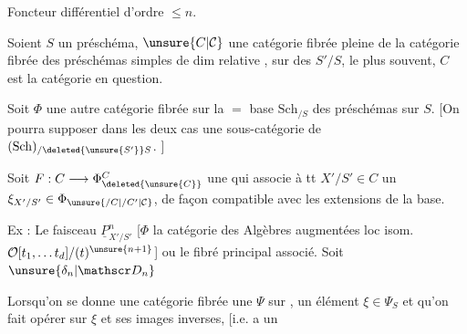 Foncteur différentiel d'ordre $\leq n$.

Soient $S$ un préschéma, $\unsure{C|\mathcal C}$  une  catégorie fibrée pleine de la catégorie fibrée des préschémas simples de dim relative , sur des $S'/S$,  le plus souvent, $C$ est  la catégorie en question.

Soit $\Phi$ une autre catégorie fibrée sur la $=$ base $\mathrm{Sch}_{/S}$ des préschémas sur $S$. [On pourra supposer dans les deux cas  une sous-catégorie de $(\mathrm{Sch})_{/\deleted{\unsure{S'}}S}$.  ]

Soit $F:C\longrightarrow\Phi_{\deleted{\unsure{C}}}^{C}$ une   qui associe à tt $X'/S'\in C$ un $\xi_{X'/S'}\in\Phi_{\unsure{/C|/C'|\mathcal C}}$, de façon compatible  avec les extensions de la base.

Ex : Le faisceau $\underline P^n_{X'/S'}$ [$\Phi$ la catégorie des Algèbres augmentées loc isom.  $\mathcal O[t_1,\ldots t_d]/(t)^{\unsure{n+1}}$] ou le fibré principal associé. Soit $\unsure{\delta_n|\mathscr D_n}$

Lorsqu'on se donne une catégorie fibrée une $\Psi$ sur  , un élément $\xi\in\Psi_S$ et qu'on  fait opérer   sur $\xi$ et ses images inverses, [i.e.  a un



